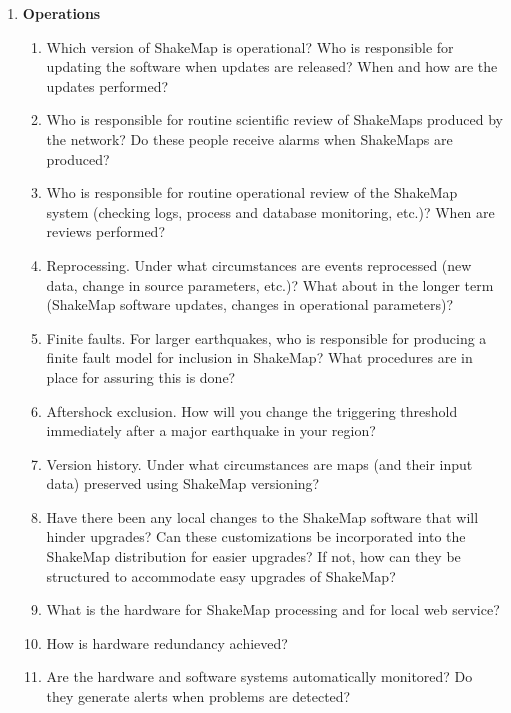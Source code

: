 \documentclass[letterpaper,10pt,english]{sphinxmanual}
\begin{document}
\begin{enumerate}
\item {} 
\textbf{Operations}
\begin{enumerate}
\item {} 
Which version of ShakeMap is operational? Who is responsible for updating
the software when updates are released? When and how are the updates performed?

\item {} 
Who is responsible for routine scientific review of ShakeMaps produced by
the network? Do these people receive alarms when ShakeMaps are produced?

\item {} 
Who is responsible for routine operational review of the ShakeMap system
(checking logs, process and database monitoring, etc.)? When are reviews
performed?

\item {} 
Reprocessing. Under what circumstances are events reprocessed (new data,
change in source parameters, etc.)? What about in the longer term (ShakeMap
software updates, changes in operational parameters)?

\item {} 
Finite faults. For larger earthquakes, who is responsible for producing a finite
fault model for inclusion in ShakeMap? What procedures are in place for
assuring this is done?

\item {} 
Aftershock exclusion. How will you change the triggering threshold
immediately after a major earthquake in your region?

\item {} 
Version history. Under what circumstances are maps (and their input data)
preserved using ShakeMap versioning?

\item {} 
Have there been any local changes to the ShakeMap software that will hinder
upgrades? Can these customizations be incorporated into the ShakeMap
distribution for easier upgrades? If not, how can they be structured to
accommodate easy upgrades of ShakeMap?

\item {} 
What is the hardware for ShakeMap processing and for local web service?

\item {} 
How is hardware redundancy achieved?

\item {} 
Are the hardware and software systems automatically monitored? Do they
generate alerts when problems are detected?


\end{enumerate}
\end{enumerate}
\end{document}
